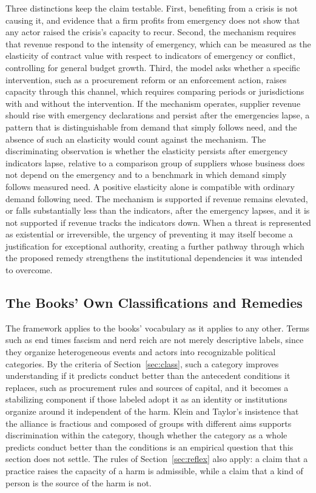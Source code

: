 \documentclass[12pt]{article}
\theoremstyle{remark}
\begin{document}
Three distinctions keep the claim testable. First, benefiting from a crisis is not causing it, and evidence that a firm profits from emergency does not show that any actor raised the crisis's capacity to recur. Second, the mechanism requires that revenue respond to the intensity of emergency, which can be measured as the elasticity of contract value with respect to indicators of emergency or conflict, controlling for general budget growth. Third, the model asks whether a specific intervention, such as a procurement reform or an enforcement action, raises capacity through this channel, which requires comparing periods or jurisdictions with and without the intervention. If the mechanism operates, supplier revenue should rise with emergency declarations and persist after the emergencies lapse, a pattern that is distinguishable from demand that simply follows need, and the absence of such an elasticity would count against the mechanism. The discriminating observation is whether the elasticity persists after emergency indicators lapse, relative to a comparison group of suppliers whose business does not depend on the emergency and to a benchmark in which demand simply follows measured need. A positive elasticity alone is compatible with ordinary demand following need. The mechanism is supported if revenue remains elevated, or falls substantially less than the indicators, after the emergency lapses, and it is not supported if revenue tracks the indicators down. When a threat is represented as existential or irreversible, the urgency of preventing it may itself become a justification for exceptional authority, creating a further pathway through which the proposed remedy strengthens the institutional dependencies it was intended to overcome.

\subsection{The Books' Own Classifications and Remedies}

The framework applies to the books' vocabulary as it applies to any other. Terms such as end times fascism and nerd reich are not merely descriptive labels, since they organize heterogeneous events and actors into recognizable political categories. By the criteria of Section~\ref{sec:class}, such a category improves understanding if it predicts conduct better than the antecedent conditions it replaces, such as procurement rules and sources of capital, and it becomes a stabilizing component if those labeled adopt it as an identity or institutions organize around it independent of the harm. Klein and Taylor's insistence that the alliance is fractious and composed of groups with different aims supports discrimination within the category, though whether the category as a whole predicts conduct better than the conditions is an empirical question that this section does not settle. The rules of Section~\ref{sec:reflex} also apply: a claim that a practice raises the capacity of a harm is admissible, while a claim that a kind of person is the source of the harm is not.
\end{document}
